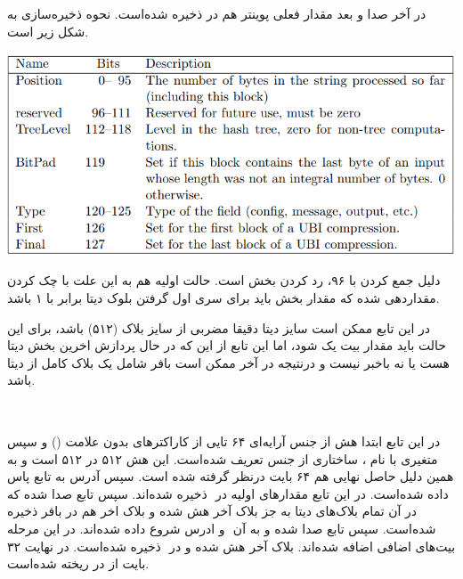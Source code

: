 در آخر \hyperref[subsec:WRITE-STATE-BIG]{}
صدا و بعد مقدار فعلی پوینتر هم در  ذخیره شده‌است.
نحوه ذخیره‌سازی  به شکل زیر است.
\begin{center}
	\includegraphics[width=14cm]{images/GoldenModelDocumentation/tweak.png}
\end{center}

دلیل جمع کردن  با ۹۶،‌ رد کردن بخش  است. حالت اولیه  هم به این علت با چک کردن  مقداردهی شده که مقدار بخش  باید برای سری اول گرفتن بلوک دیتا برابر با ۱ باشد.

در این تابع ممکن است سایز دیتا دقیقا مضربی از سایز بلاک (۵۱۲) باشد،‌ برای این حالت باید مقدار بیت  یک شود، اما این تابع از این که در حال پردازش اخرین بخش دیتا هست یا نه باخبر نیست و درنتیجه در‌ آخر ممکن است بافر شامل یک بلاک کامل از دیتا باشد.



\subsection{}
\label{subsec:skein-hash}
\\



در این تابع ابتدا هش از جنس آرایه‌ای ۶۴ تایی از کاراکتر‌های بدون علامت () و سپس متغیری با نام ، ساختاری از جنس  
 \hyperref[subsec:sph-skein-big-context]{} 
 تعریف شده‌است. این هش ۵۱۲ در ۵۱۲ است و به همین دلیل حاصل نهایی هم ۶۴ بایت درنظر گرفته شده است. سپس آدرس  به تابع\hyperref[subsec:sph-skein512-init]{} پاس داده شده‌است. در این تابع مقدارهای اولیه در ‌ ذخیره شده‌اند. سپس تابع \hyperref[subsec:sph-skein512]{} صدا شده که در آن تمام بلاک‌های دیتا به جز بلاک آخر هش شده و بلاک ‌اخر هم در بافر ذخیره شده‌است. سپس تابع  \hyperref[subsec:sph-skein512-close]{} صدا شده و به آن ‌ و ادرس شروع  داده شده‌اند. در این مرحله بیت‌های اضافی اضافه شده‌اند. بلاک ‌آخر هش شده و در ‌ ذخیره شده‌است.
در نهایت ۳۲ بایت از  در  ریخته شده‌است.


